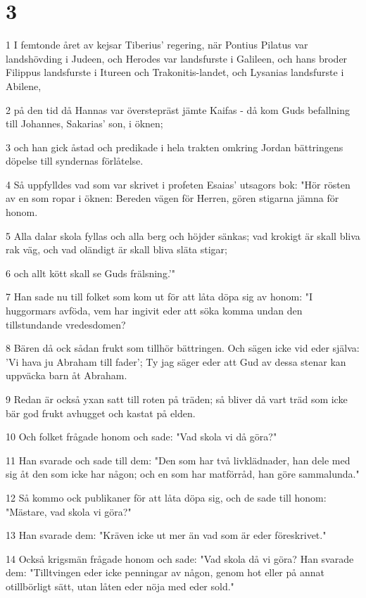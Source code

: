 \chapter{3}

\par 1 I femtonde året av kejsar Tiberius' regering, när Pontius Pilatus var landshövding i Judeen, och Herodes var landsfurste i Galileen, och hans broder Filippus landsfurste i Itureen och Trakonitis-landet, och Lysanias landsfurste i Abilene,
\par 2 på den tid då Hannas var överstepräst jämte Kaifas - då kom Guds befallning till Johannes, Sakarias' son, i öknen;
\par 3 och han gick åstad och predikade i hela trakten omkring Jordan bättringens döpelse till syndernas förlåtelse.
\par 4 Så uppfylldes vad som var skrivet i profeten Esaias' utsagors bok: "Hör rösten av en som ropar i öknen: Bereden vägen för Herren, gören stigarna jämna för honom.
\par 5 Alla dalar skola fyllas och alla berg och höjder sänkas; vad krokigt är skall bliva rak väg, och vad oländigt är skall bliva släta stigar;
\par 6 och allt kött skall se Guds frälsning.'"
\par 7 Han sade nu till folket som kom ut för att låta döpa sig av honom: "I huggormars avföda, vem har ingivit eder att söka komma undan den tillstundande vredesdomen?
\par 8 Bären då ock sådan frukt som tillhör bättringen. Och sägen icke vid eder själva: 'Vi hava ju Abraham till fader'; Ty jag säger eder att Gud av dessa stenar kan uppväcka barn åt Abraham.
\par 9 Redan är också yxan satt till roten på träden; så bliver då vart träd som icke bär god frukt avhugget och kastat på elden.
\par 10 Och folket frågade honom och sade: "Vad skola vi då göra?"
\par 11 Han svarade och sade till dem: "Den som har två livklädnader, han dele med sig åt den som icke har någon; och en som har matförråd, han göre sammalunda."
\par 12 Så kommo ock publikaner för att låta döpa sig, och de sade till honom: "Mästare, vad skola vi göra?"
\par 13 Han svarade dem: "Kräven icke ut mer än vad som är eder föreskrivet."
\par 14 Också krigsmän frågade honom och sade: "Vad skola då vi göra? Han svarade dem: "Tilltvingen eder icke penningar av någon, genom hot eller på annat otillbörligt sätt, utan låten eder nöja med eder sold."
